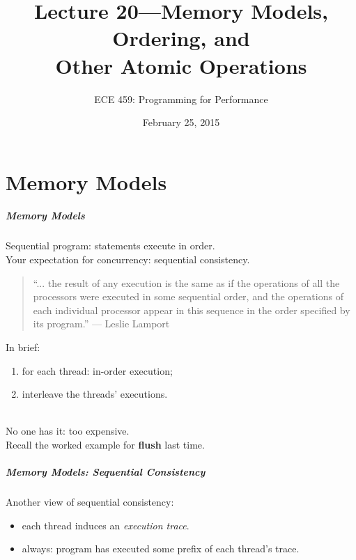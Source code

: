 \documentclass[aspectratio=43]{beamer}
\title{Lecture 20---Memory Models, Ordering, and \\ Other Atomic Operations}
\subtitle{ECE 459: Programming for Performance}
\date{February 25, 2015}
\newenvironment{changemargin}[1]{%
  \begin{list}{}{%
    \setlength{\topsep}{0pt}%
    \setlength{\leftmargin}{#1}%
    \setlength{\rightmargin}{1em}
    \setlength{\listparindent}{\parindent}%
    \setlength{\itemindent}{\parindent}%
    \setlength{\parsep}{\parskip}%
  }%
  \item[]}{\end{list}}
\begin{document}
\begin{frame}[plain]
  \titlepage
\end{frame}

\part{Memory Models}
\frame{\partpage}

\begin{frame}
  \frametitle{Memory Models}

  \begin{changemargin}{1.5cm}

  Sequential program: statements execute in order.\\

  Your expectation for concurrency: sequential consistency.

\begin{quote}
``... the result of any execution is the same as if the operations of all the processors were executed in some sequential order, and the operations of each individual processor appear in this sequence in the order specified by its program.'' --- Leslie Lamport
\end{quote}
  In brief:
  \begin{enumerate}
  \item for each thread: in-order execution;
  \item interleave the threads' executions.
  \end{enumerate}~\\

  No one has it: too expensive.\\
  Recall the worked example for {\bf flush} last time.\\[1em]

  \end{changemargin}

  
\end{frame}

\begin{frame}
  \frametitle{Memory Models: Sequential Consistency}

  \begin{changemargin}{1.5cm}
    Another view of sequential consistency:

    \begin{itemize}
      \item each thread induces an \emph{execution trace}.
      \item always: program has executed some prefix of each thread's
        trace.
    \end{itemize}
  \end{changemargin}
\end{frame}
\end{document}
